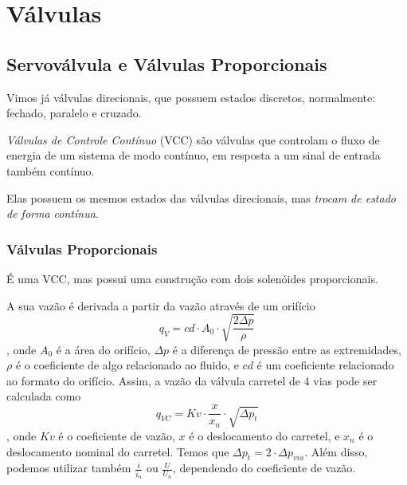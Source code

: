
\section*{Válvulas}

\subsection*{Servoválvula e Válvulas Proporcionais}

Vimos já válvulas direcionais, que possuem estados discretos, normalmente: fechado, paralelo e cruzado.

\begin{definition}
    \emph{Válvulas de Controle Contínuo} (VCC) são válvulas que controlam o fluxo de energia de um sistema de modo contínuo, em resposta a um sinal de entrada também contínuo.
\end{definition}

Elas possuem os mesmos estados das válvulas direcionais, mas \emph{trocam de estado de forma contínua}.
 
\subsubsection*{Válvulas Proporcionais}

É uma VCC, mas possui uma construção com dois solenóides proporcionais.

A sua vazão é derivada a partir da vazão através de um orifício \[
q_V = cd\cdot A_0\cdot \sqrt{\frac{2\Delta p}{\rho}} 
\], onde $A_0$ é a área do orifício, $\Delta p$ é a diferença de pressão entre as extremidades, $\rho$ é o coeficiente de algo relacionado ao fluido, e $cd$ é um coeficiente relacionado ao formato do orifício. Assim, a vazão da válvula carretel de 4 vias pode ser calculada como \[
q_{VC} = Kv\cdot \frac{x}{x_n}\cdot \sqrt{\Delta p_t} 
\], onde $Kv$ é o coeficiente de vazão, $x$ é o deslocamento do carretel, e $x_n$ é o deslocamento nominal do carretel. Temos que $\Delta p_t = 2\cdot \Delta p_{via}$. Além disso, podemos utilizar também $\frac{i}{i_n}$ ou $\frac{U}{U_n}$, dependendo do coeficiente de vazão.



